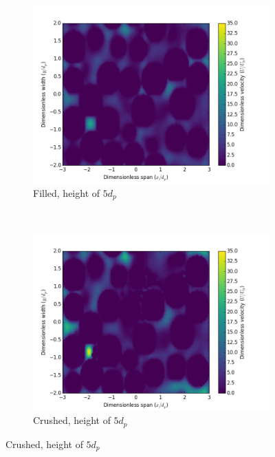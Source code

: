 \begin{figure}[!ht]
    \centering
    \begin{subfigure}[b]{0.44\textwidth}
        \includegraphics[width = \textwidth]{figures/lbm/cross-sections-filled/contour-100}
        \caption{Filled, height of $5d_p$}\label{fig:lbm-contours-filled-100}
    \end{subfigure}
    ~
    \begin{subfigure}[b]{0.44\textwidth}
        \includegraphics[width = \textwidth]{figures/lbm/cross-sections-crushed/contour-100}
        \caption{Crushed, height of $5d_p$}\label{fig:lbm-contours-crushed-100}
    \end{subfigure}


\end{figure}
